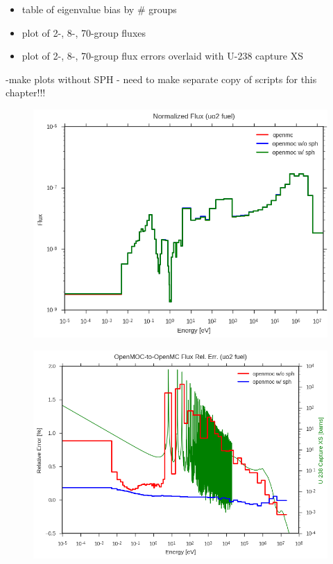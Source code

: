 \begin{itemize}[noitemsep]
  \item table of eigenvalue bias by \# groups
  \item plot of 2-, 8-, 70-group fluxes
  \item plot of 2-, 8-, 70-group flux errors overlaid with U-238 capture XS
\end{itemize}

-make plots without SPH - need to make separate copy of scripts for this chapter!!!

\begin{figure}
  \centering
  \includegraphics[width=0.9\linewidth]{figures/biases/pin-cell/flux-uo2-fuel}
  \caption{}
\label{fig:chap2-pin-flux}
\end{figure}

\begin{figure}
  \centering
  \includegraphics[width=0.9\linewidth]{figures/biases/pin-cell/rel-err-uo2-fuel}
  \caption{}
\label{fig:chap2-pin-flux}
\end{figure}


